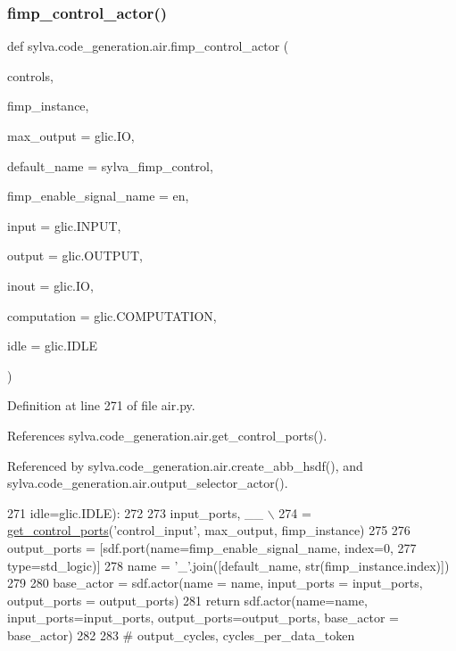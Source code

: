 \subsubsection{\texorpdfstring{fimp\+\_\+control\+\_\+actor()}{fimp\_control\_actor()}}
{\footnotesize\ttfamily def sylva.\+code\+\_\+generation.\+air.\+fimp\+\_\+control\+\_\+actor (\begin{DoxyParamCaption}\item[{}]{controls,  }\item[{}]{fimp\+\_\+instance,  }\item[{}]{max\+\_\+output = {\ttfamily glic.IO},  }\item[{}]{default\+\_\+name = {\ttfamily \textquotesingle{}sylva\+\_\+fimp\+\_\+control\textquotesingle{}},  }\item[{}]{fimp\+\_\+enable\+\_\+signal\+\_\+name = {\ttfamily \textquotesingle{}en\textquotesingle{}},  }\item[{}]{input = {\ttfamily glic.INPUT},  }\item[{}]{output = {\ttfamily glic.OUTPUT},  }\item[{}]{inout = {\ttfamily glic.IO},  }\item[{}]{computation = {\ttfamily glic.COMPUTATION},  }\item[{}]{idle = {\ttfamily glic.IDLE} }\end{DoxyParamCaption})}



Definition at line 271 of file air.\+py.



References sylva.\+code\+\_\+generation.\+air.\+get\+\_\+control\+\_\+ports().



Referenced by sylva.\+code\+\_\+generation.\+air.\+create\+\_\+abb\+\_\+hsdf(), and sylva.\+code\+\_\+generation.\+air.\+output\+\_\+selector\+\_\+actor().


\begin{DoxyCode}
271   idle=glic.IDLE):
272 
273   input\_ports, \_\_ \(\backslash\)
274   = \hyperlink{namespacesylva_1_1code__generation_1_1air_a71d379169f113b29c326aa9f70c6d47e}{get\_control\_ports}(\textcolor{stringliteral}{'control\_input'}, max\_output, fimp\_instance)
275 
276   output\_ports = [sdf.port(name=fimp\_enable\_signal\_name, index=0,
277                            type=std\_logic)]
278   name = \textcolor{stringliteral}{'\_'}.join([default\_name, str(fimp\_instance.index)])
279 
280   base\_actor = sdf.actor(name = name, input\_ports = input\_ports, output\_ports = output\_ports)
281   \textcolor{keywordflow}{return} sdf.actor(name=name, input\_ports=input\_ports, output\_ports=output\_ports, base\_actor = base\_actor)
282 
283 \textcolor{comment}{# output\_cycles, cycles\_per\_data\_token}
\end{DoxyCode}
\mbox{\label{namespacesylva_1_1code__generation_1_1air_a71d379169f113b29c326aa9f70c6d47e}} 

